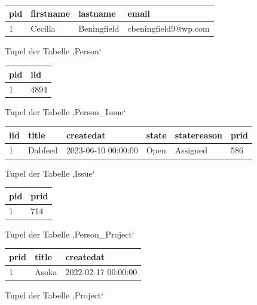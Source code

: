 \begin{figure}[H]
	\centering
	\begin{tabular}{|l | l | l | l |}
	\hline
	pid & firstname & lastname & email \\
	\hline
	1 & Cecilla & Beningfield & cbeningfield9@wp.com \\
	\hline
	\end{tabular}
	\caption{Tupel der Tabelle ‚Person‘}
\end{figure}
\begin{figure}[H]
	\centering
	\begin{tabular}{|l | l |}
	\hline
	pid & iid \\
	\hline
	1 & 4894 \\
	\hline
	\end{tabular}
	\caption{Tupel der Tabelle ‚Person\_Issue‘}
\end{figure}
\begin{figure}[H]
	\centering
	\begin{tabular}{|l | l | l | l | l | l|}
	\hline
	iid & title & createdat & state & statereason & prid \\
	\hline
	1 & Dabfeed & 2023-06-10 00:00:00 & Open & Assigned & 586 \\
	\hline
	\end{tabular}
	\caption{Tupel der Tabelle ‚Issue‘}
\end{figure}
\begin{figure}[H]
	\centering
	\begin{tabular}{|l | l |}
	\hline
	pid & prid \\
	\hline
	1 & 714 \\
	\hline
	\end{tabular}
	\caption{Tupel der Tabelle ‚Person\_Project‘}
\end{figure}
\begin{figure}[H]
	\centering
	\begin{tabular}{|l | l | l |}
	\hline
	prid & title & createdat \\
	\hline
	1 & Asoka & 2022-02-17 00:00:00 \\
	\hline
	\end{tabular}
	\caption{Tupel der Tabelle ‚Project‘}
\end{figure}
\newpage


